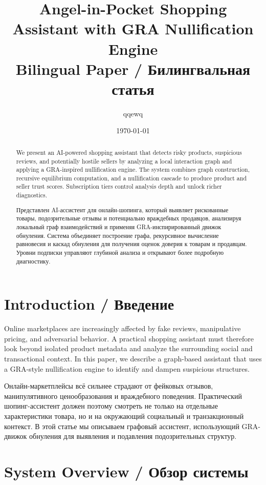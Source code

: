 \documentclass[12pt,a4paper]{article}
\title{Angel-in-Pocket Shopping Assistant with GRA Nullification Engine\\
\large Bilingual Paper / Билингвальная статья}
\author{qqewq}
\date{\today}
\begin{document}
\maketitle

\begin{abstract}
We present an AI-powered shopping assistant that detects risky products, suspicious reviews, and potentially hostile sellers by analyzing a local interaction graph and applying a GRA-inspired nullification engine. The system combines graph construction, recursive equilibrium computation, and a nullification cascade to produce product and seller trust scores. Subscription tiers control analysis depth and unlock richer diagnostics.

Представлен AI-ассистент для онлайн-шопинга, который выявляет рискованные товары, подозрительные отзывы и потенциально враждебных продавцов, анализируя локальный граф взаимодействий и применяя GRA-инспирированный движок обнуления. Система объединяет построение графа, рекурсивное вычисление равновесия и каскад обнуления для получения оценок доверия к товарам и продавцам. Уровни подписки управляют глубиной анализа и открывают более подробную диагностику.
\end{abstract}

\section{Introduction / Введение}

Online marketplaces are increasingly affected by fake reviews, manipulative pricing, and adversarial behavior. A practical shopping assistant must therefore look beyond isolated product metadata and analyze the surrounding social and transactional context. In this paper, we describe a graph-based assistant that uses a GRA-style nullification engine to identify and dampen suspicious structures.

Онлайн-маркетплейсы всё сильнее страдают от фейковых отзывов, манипулятивного ценообразования и враждебного поведения. Практический шопинг-ассистент должен поэтому смотреть не только на отдельные характеристики товара, но и на окружающий социальный и транзакционный контекст. В этой статье мы описываем графовый ассистент, использующий GRA-движок обнуления для выявления и подавления подозрительных структур.

\section{System Overview / Обзор системы}
\end{document}

